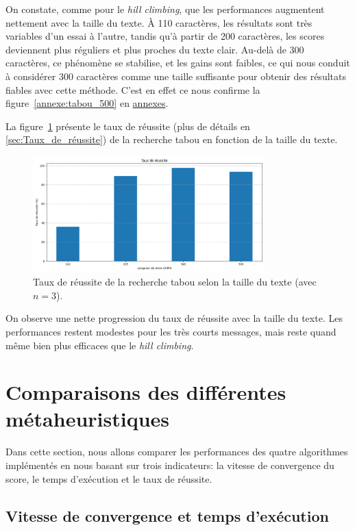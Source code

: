 \documentclass[a4paper]{article}
\begin{document}
On constate, comme pour le \textit{hill climbing}, que les performances augmentent nettement avec la taille du texte. À 110 caractères, les résultats sont très variables d’un essai à l’autre, tandis qu’à partir de 200 caractères, les scores deviennent plus réguliers et plus proches du texte clair. Au-delà de 300 caractères, ce phénomène se stabilise, et les gains sont faibles, ce qui nous conduit à considérer 300 caractères comme une taille suffisante pour obtenir des résultats fiables avec cette méthode. C'est en effet ce nous confirme la figure~\ref{annexe:tabou_500} en \hyperref[sec:annexes]{annexes}.

\medskip

La figure~\ref{fig:tabou_taux} présente le taux de réussite (plus de détails en \ref{sec:Taux_de_réussite}) de la recherche tabou en fonction de la taille du texte.

\begin{figure}[H]
    \centering
    \includegraphics[width=0.8\textwidth]{taux_reussite_tabou.png}
    \caption{Taux de réussite de la recherche tabou selon la taille du texte (avec $n = 3$).}
    \label{fig:tabou_taux}
\end{figure}

On observe une nette progression du taux de réussite avec la taille du texte. Les performances restent modestes pour les très courts messages, mais reste quand même bien plus efficaces que le \textit{hill climbing}.

\section{Comparaisons des différentes métaheuristiques}
\label{sec:comparaison_meta}
Dans cette section, nous allons comparer les performances des quatre algorithmes implémentés en nous basant sur trois indicateurs: la vitesse de convergence du score, le temps d’exécution et le taux de réussite.

\subsection{Vitesse de convergence et temps d'exécution}
\end{document}
